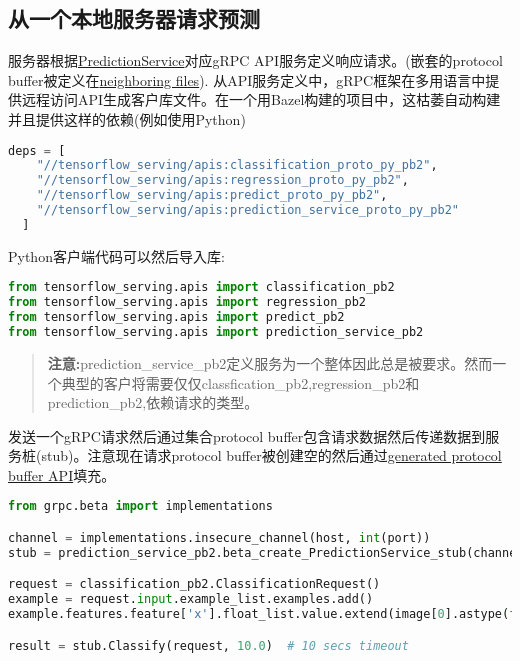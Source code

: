 \subsection{从一个本地服务器请求预测}
服务器根据\href{https://github.com/tensorflow/serving/blob/master/tensorflow_serving/apis/prediction_service.proto#L15}{PredictionService}对应gRPC API服务定义响应请求。(嵌套的protocol buffer被定义在\href{https://github.com/tensorflow/serving/blob/master/tensorflow_serving/apis}{neighboring files}).
从API服务定义中，gRPC框架在多用语言中提供远程访问API生成客户库文件。在一个用Bazel构建的项目中，这枯萎自动构建并且提供这样的依赖(例如使用Python)
\begin{lstlisting}[language=Python]
 deps = [
    "//tensorflow_serving/apis:classification_proto_py_pb2",
    "//tensorflow_serving/apis:regression_proto_py_pb2",
    "//tensorflow_serving/apis:predict_proto_py_pb2",
    "//tensorflow_serving/apis:prediction_service_proto_py_pb2"
  ]
\end{lstlisting}
Python客户端代码可以然后导入库:
\begin{lstlisting}[language=Python]
from tensorflow_serving.apis import classification_pb2
from tensorflow_serving.apis import regression_pb2
from tensorflow_serving.apis import predict_pb2
from tensorflow_serving.apis import prediction_service_pb2
\end{lstlisting}
\begin{quote}
\textbf{注意:}prediction\_service\_pb2定义服务为一个整体因此总是被要求。然而一个典型的客户将需要仅仅classfication\_pb2,regression\_pb2和prediction\_pb2,依赖请求的类型。
\end{quote}
发送一个gRPC请求然后通过集合protocol buffer包含请求数据然后传递数据到服务桩(stub)。注意现在请求protocol buffer被创建空的然后通过\href{https://developers.google.com/protocol-buffers/docs/reference/python-generated?hl=zh-cn}{generated protocol buffer API}填充。
\begin{lstlisting}[language=Python]
from grpc.beta import implementations

channel = implementations.insecure_channel(host, int(port))
stub = prediction_service_pb2.beta_create_PredictionService_stub(channel)

request = classification_pb2.ClassificationRequest()
example = request.input.example_list.examples.add()
example.features.feature['x'].float_list.value.extend(image[0].astype(float))

result = stub.Classify(request, 10.0)  # 10 secs timeout
\end{lstlisting}
